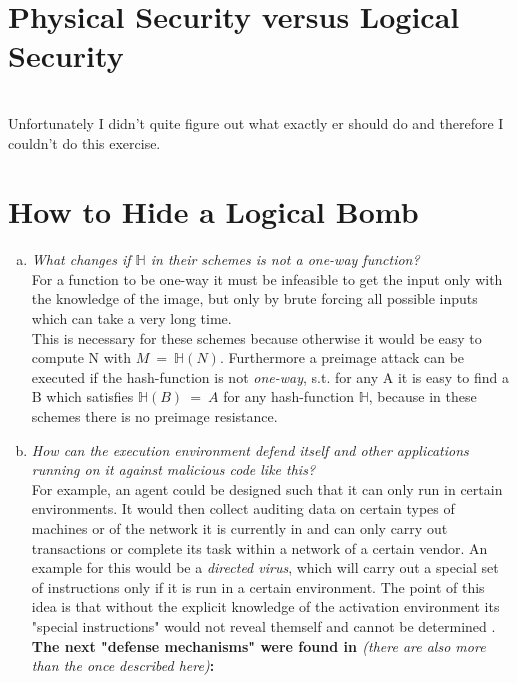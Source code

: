\documentclass{report}
\begin{document}
	\pagestyle{fancy}
	

	\section{Physical Security versus Logical Security}
	\startsection
		\cite{DG99} \cite{IGDC} \\
		Unfortunately I didn't quite figure out what exactly er should do and therefore I couldn't do this exercise.
	\closesection
	
	\section{How to Hide a Logical Bomb}
	\startsection
		\begin{enumerate}[a)]
			\item \textit{What changes if $\mathbb{H}$ in their schemes is not a one-way function?} \\
			For a function to be one-way it must be infeasible to get the input only with the knowledge of the image, but only by brute forcing all possible inputs which can take a very long time. \\
			This is necessary for these schemes because otherwise it would be easy to compute N with $M \ = \ \mathbb{H}(N)$. Furthermore a preimage attack can be executed if the hash-function is not \textit{one-way}, s.t. for any A it is easy to find a B which satisfies $\mathbb{H}(B) \ = \ A$ for any hash-function $\mathbb{H}$, because in these schemes there is no preimage resistance.
			\item \textit{How can the execution environment defend itself and other applications running on it against malicious code like this?} \\
			For example, an agent could be designed such that it can only run in certain environments. It would then collect auditing data on certain types of machines or of the network it is currently in and can only carry out transactions or complete its task within a network of a certain vendor. An example for this would be a \textit{directed virus}, which will carry out a special set of instructions only if it is run in a certain environment. The point of this idea is that without the explicit knowledge of the activation environment its "special instructions" would not reveal themself and cannot be determined \cite{Riordan1998EnvironmentalKG}. \\
			\textbf{The next "defense mechanisms" were found in \cite{AB05}} \textit{(there are also more than the once described here)}\textbf{:} \\

\end{enumerate}
\end{document}
